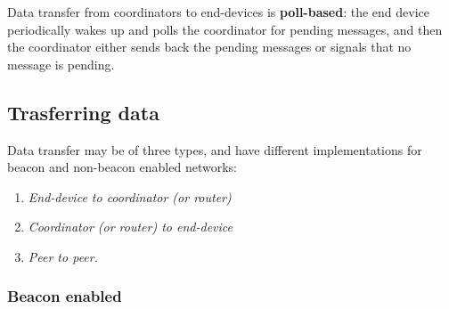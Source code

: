 Data transfer from coordinators to end-devices is
\textbf{poll-based}: the end device periodically wakes up and polls the coordinator for pending messages, and then the coordinator either sends back the pending messages or signals that no message is pending.


\subsection{Trasferring data}
Data transfer may be of three types, and have different implementations for beacon and non-beacon enabled networks:
\begin{enumerate}
   \item \textit{End-device to coordinator (or router)}
   \item \textit{Coordinator (or router) to end-device}
   \item \textit{Peer to peer.}
\end{enumerate}

\newpage
\subsubsection{Beacon enabled}

